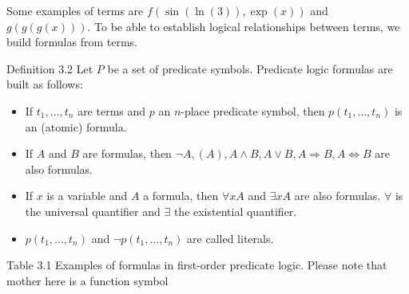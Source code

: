 \documentclass[10pt]{book}
\begin{document}
Some examples of terms are $f(\sin (\ln (3)), \exp (x))$ and $g(g(g(x)))$. To be able to establish logical relationships between terms, we build formulas from terms.

Definition 3.2 Let $P$ be a set of predicate symbols. Predicate logic formulas are built as follows:

\begin{itemize}
  \item If $t_{1}, \ldots, t_{n}$ are terms and $p$ an $n$-place predicate symbol, then $p\left(t_{1}, \ldots, t_{n}\right)$ is an (atomic) formula.
  \item If $A$ and $B$ are formulas, then $\neg A,(A), A \wedge B, A \vee B, A \Rightarrow B, A \Leftrightarrow B$ are also formulas.
  \item If $x$ is a variable and $A$ a formula, then $\forall x A$ and $\exists x A$ are also formulas. $\forall$ is the universal quantifier and $\exists$ the existential quantifier.
  \item $p\left(t_{1}, \ldots, t_{n}\right)$ and $\neg p\left(t_{1}, \ldots, t_{n}\right)$ are called literals.
\end{itemize}

Table 3.1 Examples of formulas in first-order predicate logic. Please note that mother here is a function symbol
\end{document}
